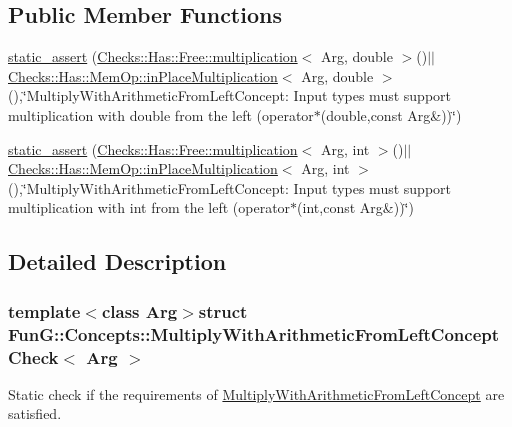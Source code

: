 \subsection*{\-Public \-Member \-Functions}
\begin{DoxyCompactItemize}
\item 
\hyperlink{structFunG_1_1Concepts_1_1MultiplyWithArithmeticFromLeftConceptCheck_a39e4c73a94809aedc0c31948acffda56}{static\-\_\-assert} (\hyperlink{namespaceFunG_1_1Checks_1_1Has_1_1Free_a2454bd1f5873cc86ec31d09d822a67b1}{\-Checks\-::\-Has\-::\-Free\-::multiplication}$<$ \-Arg, double $>$()$|$$|$\hyperlink{namespaceFunG_1_1Checks_1_1Has_1_1MemOp_ae8e502928ebc6342cab98ebbb62b8802}{\-Checks\-::\-Has\-::\-Mem\-Op\-::in\-Place\-Multiplication}$<$ \-Arg, double $>$(),\char`\"{}\-Multiply\-With\-Arithmetic\-From\-Left\-Concept\-: \-Input types must support multiplication with double from the left (operator$\ast$(double,const \-Arg\&))\char`\"{})
\item 
\hyperlink{structFunG_1_1Concepts_1_1MultiplyWithArithmeticFromLeftConceptCheck_afd8f8e26161f54c3a29803d499dd6f97}{static\-\_\-assert} (\hyperlink{namespaceFunG_1_1Checks_1_1Has_1_1Free_a2454bd1f5873cc86ec31d09d822a67b1}{\-Checks\-::\-Has\-::\-Free\-::multiplication}$<$ \-Arg, int $>$()$|$$|$\hyperlink{namespaceFunG_1_1Checks_1_1Has_1_1MemOp_ae8e502928ebc6342cab98ebbb62b8802}{\-Checks\-::\-Has\-::\-Mem\-Op\-::in\-Place\-Multiplication}$<$ \-Arg, int $>$(),\char`\"{}\-Multiply\-With\-Arithmetic\-From\-Left\-Concept\-: \-Input types must support multiplication with int from the left (operator$\ast$(int,const \-Arg\&))\char`\"{})
\end{DoxyCompactItemize}


\subsection{\-Detailed \-Description}
\subsubsection*{template$<$class \-Arg$>$struct Fun\-G\-::\-Concepts\-::\-Multiply\-With\-Arithmetic\-From\-Left\-Concept\-Check$<$ Arg $>$}

\-Static check if the requirements of \hyperlink{structFunG_1_1Concepts_1_1MultiplyWithArithmeticFromLeftConcept}{\-Multiply\-With\-Arithmetic\-From\-Left\-Concept} are satisfied. 

